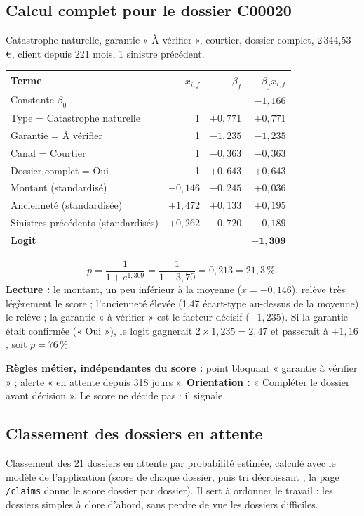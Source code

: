 \documentclass[11pt,a4paper]{article}
\begin{document}
\subsection{Calcul complet pour le dossier C00020}
Catastrophe naturelle, garantie « À vérifier », courtier, dossier complet, 2\,344,53 €, client depuis
221 mois, 1 sinistre précédent.

\begin{center}
\begin{tabular}{lrrr}
\toprule
Terme & $x_{i,f}$ & $\beta_f$ & $\beta_f x_{i,f}$ \\
\midrule
Constante $\beta_0$ & & & $-1{,}166$ \\
Type = Catastrophe naturelle & 1 & $+0{,}771$ & $+0{,}771$ \\
Garantie = À vérifier & 1 & $-1{,}235$ & $-1{,}235$ \\
Canal = Courtier & 1 & $-0{,}363$ & $-0{,}363$ \\
Dossier complet = Oui & 1 & $+0{,}643$ & $+0{,}643$ \\
Montant (standardisé) & $-0{,}146$ & $-0{,}245$ & $+0{,}036$ \\
Ancienneté (standardisée) & $+1{,}472$ & $+0{,}133$ & $+0{,}195$ \\
Sinistres précédents (standardisés) & $+0{,}262$ & $-0{,}720$ & $-0{,}189$ \\
\midrule
\textbf{Logit} & & & $\mathbf{-1{,}309}$ \\
\bottomrule
\end{tabular}
\end{center}
\[
p = \frac{1}{1+e^{1{,}309}} = \frac{1}{1+3{,}70} = 0{,}213 = 21{,}3\,\% .
\]
\textbf{Lecture :} le montant, un peu inférieur à la moyenne ($x=-0{,}146$), relève très légèrement
le score ; l'ancienneté élevée (1,47 écart-type au-dessus de la moyenne) le relève ; la garantie
« à vérifier » est le facteur décisif ($-1{,}235$). Si la garantie était confirmée (« Oui »), le
logit gagnerait $2\times1{,}235 = 2{,}47$ et passerait à $+1{,}16$, soit $p = 76\,\%$.

\textbf{Règles métier, indépendantes du score :} point bloquant « garantie à vérifier » ;
alerte « en attente depuis 318 jours ». \textbf{Orientation :} « Compléter le dossier avant
décision ». Le score ne décide pas : il signale.

\subsection{Classement des dossiers en attente}
Classement des 21 dossiers en attente par probabilité estimée, calculé avec le modèle de
l'application (score de chaque dossier, puis tri décroissant ; la page \texttt{/claims} donne le
score dossier par dossier). Il sert à ordonner le travail : les dossiers simples à clore d'abord,
sans perdre de vue les dossiers difficiles.
\end{document}
